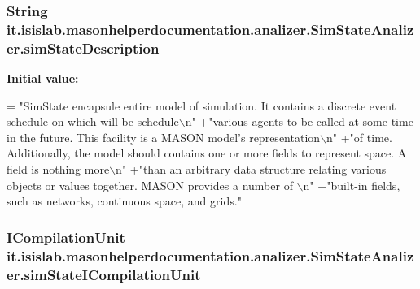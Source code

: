 \hypertarget{classit_1_1isislab_1_1masonhelperdocumentation_1_1analizer_1_1_sim_state_analizer_a313d35aaf7e8bc171ddf8b0a7912ca6c}{
\subsubsection[{sim\-State\-Description}]{\setlength{\rightskip}{0pt plus 5cm}String it.\-isislab.\-masonhelperdocumentation.\-analizer.\-Sim\-State\-Analizer.\-sim\-State\-Description\hspace{0.3cm}{\ttfamily [static]}}}\label{classit_1_1isislab_1_1masonhelperdocumentation_1_1analizer_1_1_sim_state_analizer_a313d35aaf7e8bc171ddf8b0a7912ca6c}
{\bfseries Initial value\-:}
\begin{DoxyCode}
= \textcolor{stringliteral}{"SimState encapsule entire model of simulation. It contains a discrete event schedule on which will be
       schedule\(\backslash\)n"}
                    +\textcolor{stringliteral}{"various agents to be called at some time in the future. This facility is a MASON
       model's representation\(\backslash\)n"} 
                    +\textcolor{stringliteral}{"of time. Additionally, the model should contains one or more fields to represent
       space. A field is nothing more\(\backslash\)n"}
                    +\textcolor{stringliteral}{"than an arbitrary data structure relating various objects or values together. MASON
       provides a number of \(\backslash\)n"}
                    +\textcolor{stringliteral}{"built-in fields, such as networks, continuous space, and grids."}
\end{DoxyCode}
\hypertarget{classit_1_1isislab_1_1masonhelperdocumentation_1_1analizer_1_1_sim_state_analizer_ab9778ffe58c423156222c36e9d0f7c5a}{
\subsubsection[{sim\-State\-I\-Compilation\-Unit}]{\setlength{\rightskip}{0pt plus 5cm}I\-Compilation\-Unit it.\-isislab.\-masonhelperdocumentation.\-analizer.\-Sim\-State\-Analizer.\-sim\-State\-I\-Compilation\-Unit\hspace{0.3cm}{\ttfamily [private]}}}\label{classit_1_1isislab_1_1masonhelperdocumentation_1_1analizer_1_1_sim_state_analizer_ab9778ffe58c423156222c36e9d0f7c5a}
